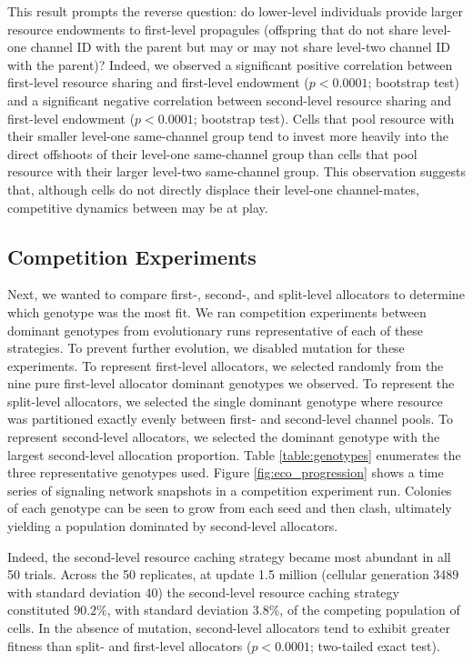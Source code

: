 This result prompts the reverse question: do lower-level individuals provide  larger resource endowments to first-level propagules (offspring that do not share level-one channel ID with the parent but may or may not share level-two channel ID with the parent)?
Indeed, we observed a significant positive correlation between first-level resource sharing and first-level endowment ($p < 0.0001$; bootstrap test) and a significant negative correlation between second-level resource sharing and first-level endowment ($p < 0.0001$; bootstrap test).
Cells that pool resource with their smaller level-one same-channel group tend to invest more heavily into the direct offshoots of their level-one same-channel group than cells that pool resource with their larger level-two same-channel group.
This observation suggests that, although cells do not directly displace their level-one channel-mates, competitive dynamics between may be at play.

\subsection{Competition Experiments}



Next, we wanted to compare first-, second-, and split-level allocators to determine which genotype was the most fit.
We ran competition experiments between dominant genotypes from evolutionary runs representative of each of these strategies.
To prevent further evolution, we disabled mutation for these experiments.
To represent first-level allocators, we selected randomly from the nine pure first-level allocator dominant genotypes we observed.
To represent the split-level allocators, we selected the single dominant genotype where resource was partitioned exactly evenly between first- and second-level channel pools.
To represent second-level allocators, we selected the dominant genotype with the largest second-level allocation proportion.
Table \ref{table:genotypes} enumerates the three representative genotypes used.
Figure \ref{fig:eco_progression} shows a time series of signaling network snapshots in a competition experiment run.
Colonies of each genotype can be seen to grow from each seed and then clash, ultimately yielding a population dominated by second-level allocators.

Indeed, the second-level resource caching strategy became most abundant in all 50 trials.
Across the 50 replicates, at update 1.5 million (cellular generation 3489 with standard deviation 40) the second-level resource caching strategy constituted $90.2 \%$, with standard deviation $3.8 \%$, of the competing population of cells.
In the absence of mutation, second-level allocators tend to exhibit greater fitness than split- and first-level allocators ($p < 0.0001$; two-tailed exact test).


